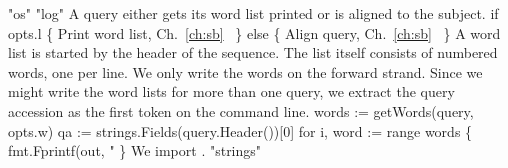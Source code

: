 \nwenddocs{}\plusendmoddef\nwstartdeflinemarkup{}\nwenddeflinemarkup
"os"
"log"
\nwendcode{}\nwdocspar
A query either gets its word list printed or is aligned to the
subject.
\nwenddocs{}\endmoddef\nwstartdeflinemarkup{}\nwenddeflinemarkup
if opts.l \{
          \LA{}Print word list, Ch.~\ref{ch:sb}~{\nwtagstyle{}}\RA{}
\} else \{
          \LA{}Align query, Ch.~\ref{ch:sb}~{\nwtagstyle{}}\RA{}
\}
\nwendcode{}\nwdocspar
A word list is started by the header of the sequence. The list itself
consists of numbered words, one per line. We only write the words on
the forward strand. Since we might write the word lists for more than
one query, we extract the query accession as the first token on the
command line.
\nwenddocs{}\endmoddef\nwstartdeflinemarkup{}\nwenddeflinemarkup
words := getWords(query, opts.w)
qa := strings.Fields(query.Header())[0]
for i, word := range words \{
          fmt.Fprintf(out, "%
\}
\nwendcode{}\nwdocspar
We import .
\nwenddocs{}\plusendmoddef\nwstartdeflinemarkup{}\nwenddeflinemarkup
"strings"
\nwendcode{}\nwdocspar
